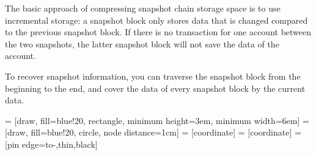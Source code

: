 \documentclass[UTF8,nofonts]{article}
\makeatletter
\newenvironment{figurehere}
 {\def\@captype{figure}}
 {}
\makeatother
\begin{document}
\begin{multicols}{2}
The basic approach of compressing snapshot chain storage space is to use incremental storage: a snapshot block only stores data that is changed compared to the previous snapshot block. If there is no transaction for one account between the two snapshots, the latter snapshot block will not save the data of the account.

To recover snapshot information, you can traverse the snapshot block from the beginning to the end, and cover the data of every snapshot block by the current data.

\begin{center}
\begin{figurehere}
\centering
{} = [draw, fill=blue!20, rectangle, 
    minimum height=3em, minimum width=6em]
 = [draw, fill=blue!20, circle, node distance=1cm]
 = [coordinate]
 = [coordinate]
 = [pin edge={to-,thin,black}]

\end{figurehere}
\end{center}
\end{multicols}
\end{document}
